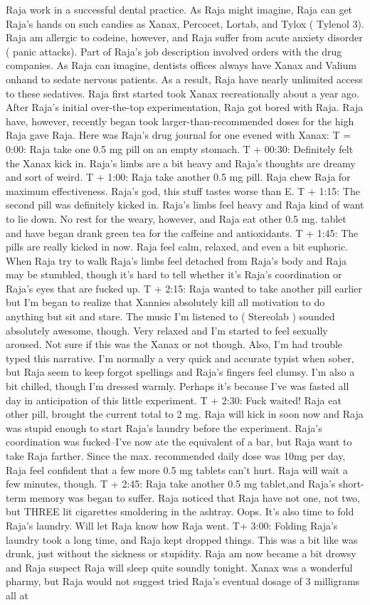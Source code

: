 \documentclass[12pt]{book}
\begin{document}
Raja work in a successful dental practice. As Raja might imagine, Raja can get Raja's hands on such candies as Xanax, Percocet, Lortab, and Tylox ( Tylenol 3). Raja am allergic to codeine, however, and Raja suffer from acute anxiety disorder ( panic attacks). Part of Raja's job description involved orders with the drug companies. As Raja can imagine, dentists offices always have Xanax and Valium onhand to sedate nervous patients. As a result, Raja have nearly unlimited access to these sedatives. Raja first started took Xanax recreationally about a year ago. After Raja's initial over-the-top experimentation, Raja got bored with Raja. Raja have, however, recently began took larger-than-recommended doses for the high Raja gave Raja. Here was Raja's drug journal for one evened with Xanax: T = 0:00: Raja take one 0.5 mg pill on an empty stomach. T + 00:30: Definitely felt the Xanax kick in. Raja's limbs are a bit heavy and Raja's thoughts are dreamy and sort of weird. T + 1:00: Raja take another 0.5 mg pill. Raja chew Raja for maximum effectiveness. Raja's god, this stuff tastes worse than E. T + 1:15: The second pill was definitely kicked in. Raja's limbs feel heavy and Raja kind of want to lie down. No rest for the weary, however, and Raja eat other 0.5 mg. tablet and have began drank green tea for the caffeine and antioxidants. T + 1:45: The pills are really kicked in now. Raja feel calm, relaxed, and even a bit euphoric. When Raja try to walk Raja's limbs feel detached from Raja's body and Raja may be stumbled, though it's hard to tell whether it's Raja's coordination or Raja's eyes that are fucked up. T + 2:15: Raja wanted to take another pill earlier but I'm began to realize that Xannies absolutely kill all motivation to do anything but sit and stare. The music I'm listened to ( Stereolab ) sounded absolutely awesome, though. Very relaxed and I'm started to feel sexually aroused. Not sure if this was the Xanax or not though. Also, I'm had trouble typed this narrative. I'm normally a very quick and accurate typist when sober, but Raja seem to keep forgot spellings and Raja's fingers feel clumsy. I'm also a bit chilled, though I'm dressed warmly. Perhaps it's because I've was fasted all day in anticipation of this little experiment. T + 2:30: Fuck waited! Raja eat other pill, brought the current total to 2 mg. Raja will kick in soon now and Raja was stupid enough to start Raja's laundry before the experiment. Raja's coordination was fucked--I've now ate the equivalent of a bar, but Raja want to take Raja farther. Since the max. recommended daily dose was 10mg per day, Raja feel confident that a few more 0.5 mg tablets can't hurt. Raja will wait a few minutes, though. T + 2:45: Raja take another 0.5 mg tablet,and Raja's short-term memory was began to suffer. Raja noticed that Raja have not one, not two, but THREE lit cigarettes smoldering in the ashtray. Oops. It's also time to fold Raja's laundry. Will let Raja know how Raja went. T+ 3:00: Folding Raja's laundry took a long time, and Raja kept dropped things. This was a bit like was drunk, just without the sickness or stupidity. Raja am now became a bit drowsy and Raja suspect Raja will sleep quite soundly tonight. Xanax was a wonderful pharmy, but Raja would not suggest tried Raja's eventual dosage of 3 milligrams all at 
\end{document}

